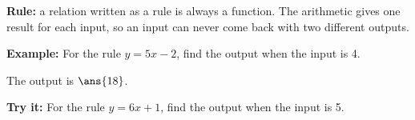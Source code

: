 \documentclass[12pt]{article}
\begin{document}
\begin{formulabox}
\textbf{Rule:} a relation written as a rule is always a function. The
arithmetic gives one result for each input, so an input can never come back
with two different outputs.
\end{formulabox}

\begin{examplebox}
\textbf{Example:} \quad For the rule $y = 5x - 2$, find the output when the
input is 4.

The output is $\ans{18}$.
\end{examplebox}

\begin{tryitbox}
\textbf{Try it:} \quad For the rule $y = 6x + 1$, find the output when the
input is 5.\\[2pt]
\end{tryitbox}
\end{document}
